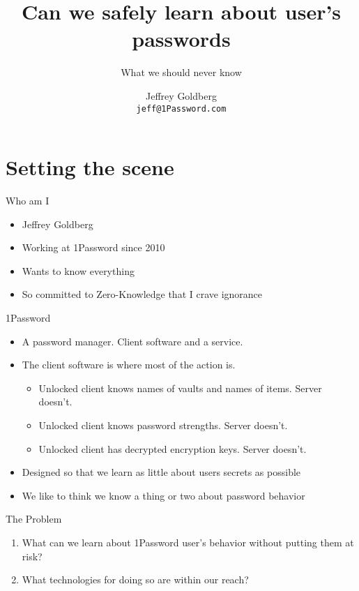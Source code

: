 \documentclass[xcolor={dvipsnames,table,hyperref}]{beamer}
\author[J.~Goldberg]
{Jeffrey Goldberg\texorpdfstring{\\ \texttt{jeff@1Password.com}}{}}
\institute[1Password]{1Password}
\title{Can we safely learn about user's passwords}
\subtitle{What we should never know}
\begin{document}
\maketitle

\section{Setting the scene}

\begin{frame}{Who am I}
  \begin{itemize}
    \item Jeffrey Goldberg
    \item Working at 1Password since 2010
    \item Wants to know everything
    \item So committed to Zero-Knowledge that I crave ignorance
  \end{itemize}

\end{frame}

\begin{frame}{1Password}
  \begin{itemize}
    \item A password manager. Client software and a service.
    \item The client software is where most of the action is.
          \begin{itemize}
            \item Unlocked client knows names of vaults and names of items. Server doesn't.
            \item Unlocked client knows password strengths. Server doesn't.
            \item Unlocked client has decrypted encryption keys. Server doesn't.
          \end{itemize}
    \item Designed so that we learn as little about users secrets as possible
    \item We like to think we know a thing or two about password behavior
  \end{itemize}
\end{frame}

\begin{frame}{The Problem}
  \begin{enumerate}
    \item What can we learn about 1Password user's behavior without putting them at risk?
    \item What technologies for doing so are within our reach?
  \end{enumerate}
\end{frame}
\end{document}
